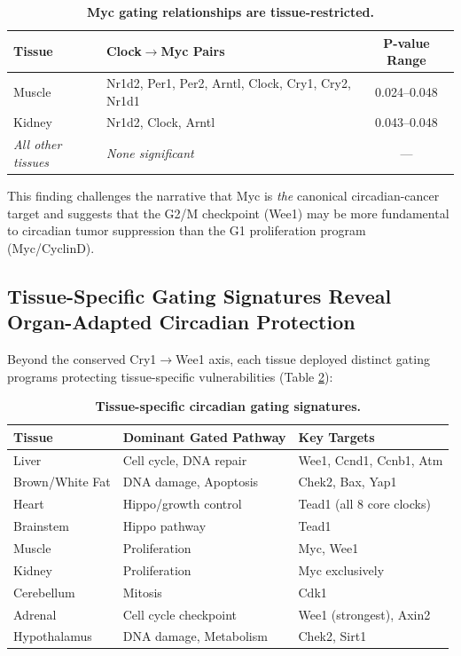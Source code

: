 \documentclass[11pt,letterpaper]{article}
\begin{document}
\begin{table}[H]
\centering
\caption{\textbf{Myc gating relationships are tissue-restricted.}}
\label{tab:myc}
\begin{tabular}{llc}
\toprule
\textbf{Tissue} & \textbf{Clock$\rightarrow$Myc Pairs} & \textbf{P-value Range} \\
\midrule
Muscle & Nr1d2, Per1, Per2, Arntl, Clock, Cry1, Cry2, Nr1d1 & 0.024--0.048 \\
Kidney & Nr1d2, Clock, Arntl & 0.043--0.048 \\
\textit{All other tissues} & \textit{None significant} & --- \\
\bottomrule
\end{tabular}
\end{table}

This finding challenges the narrative that Myc is \textit{the} canonical circadian-cancer target and suggests that the G2/M checkpoint (Wee1) may be more fundamental to circadian tumor suppression than the G1 proliferation program (Myc/CyclinD).

\subsection{Tissue-Specific Gating Signatures Reveal Organ-Adapted Circadian Protection}

Beyond the conserved Cry1$\rightarrow$Wee1 axis, each tissue deployed distinct gating programs protecting tissue-specific vulnerabilities (Table \ref{tab:signatures}):

\begin{table}[H]
\centering
\caption{\textbf{Tissue-specific circadian gating signatures.}}
\label{tab:signatures}
\begin{tabular}{lll}
\toprule
\textbf{Tissue} & \textbf{Dominant Gated Pathway} & \textbf{Key Targets} \\
\midrule
Liver & Cell cycle, DNA repair & Wee1, Ccnd1, Ccnb1, Atm \\
Brown/White Fat & DNA damage, Apoptosis & Chek2, Bax, Yap1 \\
Heart & Hippo/growth control & Tead1 (all 8 core clocks) \\
Brainstem & Hippo pathway & Tead1 \\
Muscle & Proliferation & Myc, Wee1 \\
Kidney & Proliferation & Myc exclusively \\
Cerebellum & Mitosis & Cdk1 \\
Adrenal & Cell cycle checkpoint & Wee1 (strongest), Axin2 \\
Hypothalamus & DNA damage, Metabolism & Chek2, Sirt1 \\
\bottomrule
\end{tabular}
\end{table}
\end{document}
